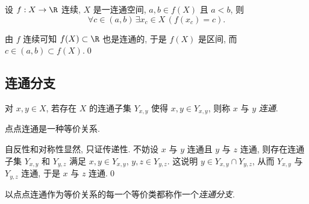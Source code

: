     \begin{Theorem}[介值定理]
        设 $ f : X\to\R $ 连续, $ X $ 是一连通空间, $ a, b\in f(X) $ 且 $ a<b $, 则
        \[
            \forall c\in(a,b)\,\exists x_c\in X\,(f(x_c)=c).
        \]
    \end{Theorem}
    \begin{Proof}
        由 $ f $ 连续可知 $ f(X)\subset\R $ 也是连通的, 于是 $ f(X) $ 是区间, 而 $ c\in(a,b)\subset f(X) $.\qed
    \end{Proof}

\subsection{连通分支}

    \begin{Definition}[点点连通]
        对 $ x,y\in X $, 若存在 $ X $ 的连通子集 $ Y_{x,y} $ 使得 $ x,y\in Y_{x,y} $, 则称 $ x $ 与 $ y $ \emph{连通}.
    \end{Definition}
    
    \begin{Proposition}
        点点连通是一种等价关系.
    \end{Proposition}
    \begin{Proof}
        自反性和对称性显然, 只证传递性. 不妨设 $ x $ 与 $ y $ 连通且 $ y $ 与 $ z $ 连通, 则存在连通子集 $ Y_{x,y} $ 和 $ Y_{y,z} $ 满足 $ x,y\in Y_{x,y} $, $ y,z\in Y_{y,z} $. 这说明 $ y\in Y_{x,y}\cap Y_{y,z} $, 从而 $ Y_{x,y} $ 与 $ Y_{y,z} $ 连通, 于是 $ x $ 与 $ z $ 连通.\qed
    \end{Proof}

    \begin{Definition}[连通分支]
        以点点连通作为等价关系的每一个等价类都称作一个\emph{连通分支}.
    \end{Definition}
    
